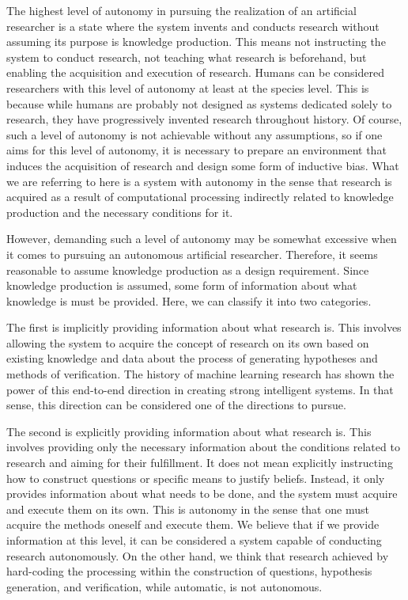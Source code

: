 \documentclass{book}
\begin{document}
The highest level of autonomy in pursuing the realization of an artificial researcher is a state where the system invents and conducts research without assuming its purpose is knowledge production. This means not instructing the system to conduct research, not teaching what research is beforehand, but enabling the acquisition and execution of research. Humans can be considered researchers with this level of autonomy at least at the species level. This is because while humans are probably not designed as systems dedicated solely to research, they have progressively invented research throughout history. Of course, such a level of autonomy is not achievable without any assumptions, so if one aims for this level of autonomy, it is necessary to prepare an environment that induces the acquisition of research and design some form of inductive bias. What we are referring to here is a system with autonomy in the sense that research is acquired as a result of computational processing indirectly related to knowledge production and the necessary conditions for it.

However, demanding such a level of autonomy may be somewhat excessive when it comes to pursuing an autonomous artificial researcher. Therefore, it seems reasonable to assume knowledge production as a design requirement. Since knowledge production is assumed, some form of information about what knowledge is must be provided. Here, we can classify it into two categories.

The first is implicitly providing information about what research is. This involves allowing the system to acquire the concept of research on its own based on existing knowledge and data about the process of generating hypotheses and methods of verification. The history of machine learning research has shown the power of this end-to-end direction in creating strong intelligent systems. In that sense, this direction can be considered one of the directions to pursue.

The second is explicitly providing information about what research is. This involves providing only the necessary information about the conditions related to research and aiming for their fulfillment. It does not mean explicitly instructing how to construct questions or specific means to justify beliefs. Instead, it only provides information about what needs to be done, and the system must acquire and execute them on its own. This is autonomy in the sense that one must acquire the methods oneself and execute them. We believe that if we provide information at this level, it can be considered a system capable of conducting research autonomously. On the other hand, we think that research achieved by hard-coding the processing within the construction of questions, hypothesis generation, and verification, while automatic, is not autonomous.
\end{document}
